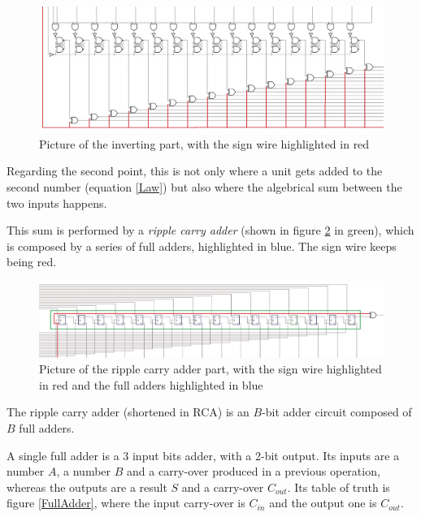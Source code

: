 \documentclass{article}
\begin{document}
\begin{figure}[h]
  \centering
  \includegraphics[scale=0.35]{SC_Processing1.JPG}
  \caption{Picture of the inverting part, with the sign wire highlighted in red}
  \label{Processing1}
\end{figure}

Regarding the second point, this is not only where a unit gets added to the second number (equation \ref{Law}) but also where the algebrical sum between the two inputs happens.

This sum is performed by a \textit{ripple carry adder} (shown in figure \ref{RCA} in green), which is composed by a series of full adders, highlighted in blue. The sign wire keeps being red.

\begin{figure}[h]
  \centering
  \includegraphics[scale=0.43]{SC_Processing2.JPG}
  \caption{Picture of the ripple carry adder part, with the sign wire highlighted in red and the full adders highlighted in blue}
  \label{RCA}
\end{figure}

The ripple carry adder (shortened in RCA) is an $B$-bit adder circuit composed of $B$ full adders. 

A single full adder is a 3 input bits adder, with a 2-bit output. Its inputs are a number $A$, a number $B$ and a carry-over produced in a previous operation, whereas the outputs are a result $S$ and a carry-over $C_{out}$. Its table of truth is figure \ref{FullAdder}, where the input carry-over is $C_{in}$ and the output one is $C_{out}$.
\end{document}

